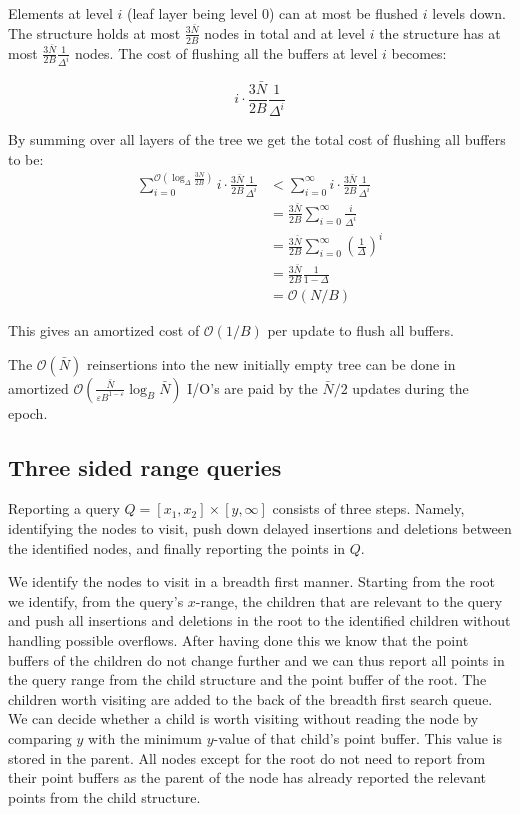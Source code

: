 \documentclass[twoside,11pt,openright]{report}
\def \epsilon {\varepsilon}
\begin{document}
Elements at level $i$ (leaf layer being level 0) can at most be flushed $i$ levels down.
The structure holds at most $\frac{3\bar{N}}{2B}$ nodes in total and at level $i$ the structure has at most $\frac{3\bar{N}}{2B} \frac{1}{\Delta^i}$ nodes. The cost of flushing all the buffers at level $i$ becomes:

$$ i \cdot \frac{3\bar{N}}{2B} \frac{1}{\Delta^i}$$

By summing over all layers of the tree we get the total cost of flushing all buffers to be:
\begin{align*}
\sum\limits_{i=0}^{\mathcal{O}(\log_\Delta \frac{3N}{2B})} i \cdot \frac{3\bar{N}}{2B} \frac{1}{\Delta^i} &< 
\sum\limits_{i=0}^{\infty} i \cdot \frac{3\bar{N}}{2B} \frac{1}{\Delta^i} \\
&= \frac{3\bar{N}}{2B} \sum\limits_{i=0}^{\infty} \frac{i}{\Delta^i} \\
&= \frac{3\bar{N}}{2B} \sum\limits_{i=0}^{\infty} \left(\frac{1}{\Delta}\right)^i \\
&= \frac{3\bar{N}}{2B} \frac{1}{1-\Delta} \\
&= \mathcal{O}(N/B)
\end{align*}

This gives an amortized cost of $\mathcal{O}(1/B)$ per update to flush all buffers.

The $\mathcal{O}(\bar{N})$ reinsertions into the new initially empty tree can be done in amortized $\mathcal{O}(\frac{\bar{N}}{\epsilon B^{1-\epsilon}}\log_B\bar{N})$ I/O's are paid by the $\bar{N}/2$ updates during the epoch.

\subsection{Three sided range queries}
\label{subsec:brodal_3_sided}
Reporting a query $Q = \left[ x_1,x_2 \right] \times \left[y, \infty \right]$ consists of three steps. Namely, identifying the nodes to visit, push down delayed insertions and deletions between the identified nodes, and finally reporting the points in $Q$.

We identify the nodes to visit in a breadth first manner.
Starting from the root we identify, from the query's $x$-range, the children that are relevant to the query and push all insertions and deletions in the root to the identified children without handling possible overflows. After having done this we know that the point buffers of the children do not change further and we can thus report all points in the query range from the child structure and the point buffer of the root. The children worth visiting are added to the back of the breadth first search queue. We can decide whether a child is worth visiting without reading the node by comparing $y$ with the minimum $y$-value of that child's point buffer. This value is stored in the parent.
All nodes except for the root do not need to report from their point buffers as the parent of the node has already reported the relevant points from the child structure.
\end{document}

